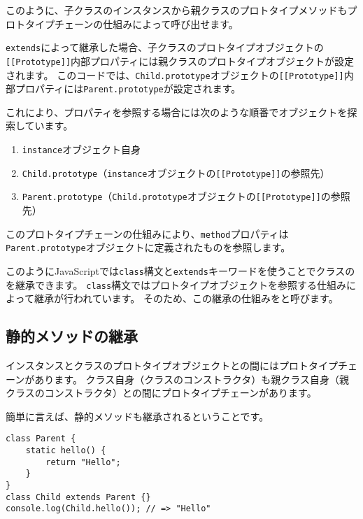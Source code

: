 このように、子クラスのインスタンスから親クラスのプロトタイプメソッドもプロトタイプチェーンの仕組みによって呼び出せます。

\texttt{extends}によって継承した場合、子クラスのプロトタイプオブジェクトの\texttt{[[Prototype]]}内部プロパティには親クラスのプロトタイプオブジェクトが設定されます。
このコードでは、\texttt{Child.prototype}オブジェクトの\texttt{[[Prototype]]}内部プロパティには\texttt{Parent.prototype}が設定されます。

これにより、プロパティを参照する場合には次のような順番でオブジェクトを探索しています。

\begin{enumerate}
\def\labelenumi{\arabic{enumi}.}
\item
  \texttt{instance}オブジェクト自身
\item
  \texttt{Child.prototype}（\texttt{instance}オブジェクトの\texttt{[[Prototype]]}の参照先）
\item
  \texttt{Parent.prototype}（\texttt{Child.prototype}オブジェクトの\texttt{[[Prototype]]}の参照先）
\end{enumerate}

このプロトタイプチェーンの仕組みにより、\texttt{method}プロパティは\texttt{Parent.prototype}オブジェクトに定義されたものを参照します。

このようにJavaScriptでは\texttt{class}構文と\texttt{extends}キーワードを使うことでクラスの\textbf{}を継承できます。
\texttt{class}構文ではプロトタイプオブジェクトを参照する仕組みによって継承が行われています。
そのため、この継承の仕組みを\textbf{}と呼びます。

\hypertarget{static-inheritance}{%
\subsection{静的メソッドの継承}\label{static-inheritance}}

インスタンスとクラスのプロトタイプオブジェクトとの間にはプロトタイプチェーンがあります。
クラス自身（クラスのコンストラクタ）も親クラス自身（親クラスのコンストラクタ）との間にプロトタイプチェーンがあります。

簡単に言えば、静的メソッドも継承されるということです。

\begin{lstlisting}
class Parent {
    static hello() {
        return "Hello";
    }
}
class Child extends Parent {}
console.log(Child.hello()); // => "Hello"
\end{lstlisting}

